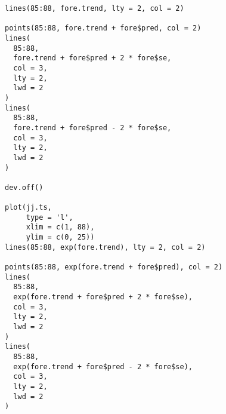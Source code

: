 \begin{verbatim}
lines(85:88, fore.trend, lty = 2, col = 2)

points(85:88, fore.trend + fore$pred, col = 2)
lines(
  85:88,
  fore.trend + fore$pred + 2 * fore$se,
  col = 3,
  lty = 2,
  lwd = 2
)
lines(
  85:88,
  fore.trend + fore$pred - 2 * fore$se,
  col = 3,
  lty = 2,
  lwd = 2
)

dev.off()

plot(jj.ts,
     type = 'l',
     xlim = c(1, 88),
     ylim = c(0, 25))
lines(85:88, exp(fore.trend), lty = 2, col = 2)

points(85:88, exp(fore.trend + fore$pred), col = 2)
lines(
  85:88,
  exp(fore.trend + fore$pred + 2 * fore$se),
  col = 3,
  lty = 2,
  lwd = 2
)
lines(
  85:88,
  exp(fore.trend + fore$pred - 2 * fore$se),
  col = 3,
  lty = 2,
  lwd = 2
)
\end{verbatim}
